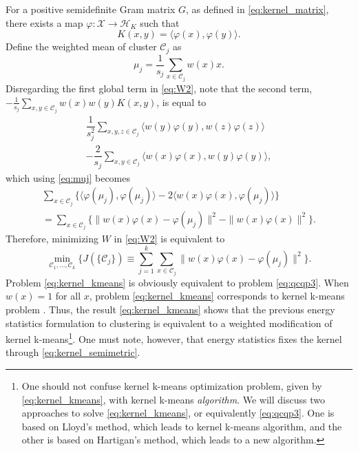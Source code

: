 \documentclass[10pt,journal,compsoc]{IEEEtran}
\newcommand\kk{K}
\newcommand\HH{\mathcal{H}}
\newcommand\C{{\mathcal{C}}}
\begin{document}
For a positive semidefinite Gram matrix $G$, as defined in
\eqref{eq:kernel_matrix},
there exists a map
$\varphi: \mathcal{X} \to \HH_\kk$ such that
\begin{equation}
\kk(x,y) = \langle \varphi(x), \varphi(y) \rangle. 
\end{equation}
Define the weighted mean of cluster $\C_j$ as
\begin{equation}
\label{eq:muj}
\mu_j = \dfrac{1}{s_j} \sum_{x \in \C_j} w(x) x.
\end{equation}
Disregarding the first global term in \eqref{eq:W2}, note
that the second term,
$-\tfrac{1}{s_j} \sum_{x,y \in \C_j} w(x) w(y) \kk(x,y)$,
is equal to
\begin{multline}
\dfrac{1}{s_j^2}\sum_{x,y,z\in\C_j} 
\langle w(y) \varphi(y),  w(z) \varphi(z) \rangle \\
-\dfrac{2}{s_j}\sum_{x,y\in\C_j} \langle w(x) \varphi(x),  
w(y) \varphi(y) \rangle ,
\end{multline}
which using 
\eqref{eq:muj}
becomes
\begin{multline}
\sum_{x\in\C_j} 
\big\{ \langle \varphi(\mu_j), \varphi(\mu_j) \rangle - 
2 \langle w(x)\varphi(x),
\varphi(\mu_j) \rangle \big\} \\ = 
\sum_{x\in\C_j}\big\{ \| w(x) \varphi(x) - \varphi(\mu_j) \|^2 -
\|w(x)\varphi(x)\|^2\big\}.
\end{multline}
Therefore, minimizing $W$ in \eqref{eq:W2} is equivalent to
\begin{equation}
\label{eq:kernel_kmeans}
\min_{\C_1,\dotsc,\C_k}\bigg\{ 
J(\{\C_j\}) \equiv  \sum_{j=1}^k
\sum_{x \in \C_j} \| w(x) \varphi(x) - \varphi(\mu_j) \|^2
\bigg\} .
\end{equation}
Problem \eqref{eq:kernel_kmeans} is obviously  equivalent to
problem \eqref{eq:qcqp3}. 
When $w(x) = 1$ for all
$x$, problem \eqref{eq:kernel_kmeans} corresponds to 
kernel k-means problem
\cite{Dhillon2,Dhillon}. Thus, the result \eqref{eq:kernel_kmeans} shows
that the previous energy statistics formulation to clustering
is equivalent to a weighted
modification of kernel k-means\footnote{
One should not confuse kernel k-means optimization problem,
given by \eqref{eq:kernel_kmeans}, with kernel k-means \emph{algorithm}.
We will discuss two approaches to solve \eqref{eq:kernel_kmeans},
or equivalently \eqref{eq:qcqp3}. One is 
based on Lloyd's method, which leads to kernel k-means algorithm, and the other is based on Hartigan's method,
which leads to a new algorithm.
}. One must note, however, that energy statistics fixes the kernel
through \eqref{eq:kernel_semimetric}.
\end{document}
